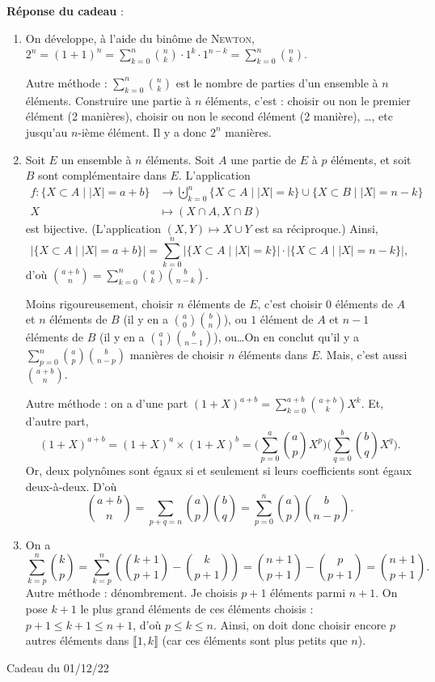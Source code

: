 \documentclass[a4paper]{article}
\begin{document}
	\textbf{Réponse du cadeau} :
	\begin{enumerate}
		\item On développe, à l'aide du binôme de \textsc{Newton}, $2^n = (1+1)^n = \sum_{k=0}^n {n \choose k}\cdot 1^k\cdot 1^{n-k} = \sum_{k=0}^n {n\choose k}$.

			Autre méthode : $\sum_{k=0}^n {n\choose k}$\/ est le nombre de parties d'un ensemble à $n$\/ éléments. Construire une partie à $n$\/ éléments, c'est : choisir ou non le premier élément (2 manières), choisir ou non le second élément (2 manière), \ldots, etc jusqu'au $n$-ième élément. Il y a donc $2^n$\/ manières.
		\item Soit $E$\/ un ensemble à $n$\/ éléments. Soit $A$\/ une partie de $E$ à $p$\/ éléments, et soit $B$\/ sont complémentaire dans $E$. L'application \begin{align*}
				f: \{X \subset A  \mid |X| = a + b\} &\longrightarrow \bigcupdot_{k=0}^n \{X \subset A  \mid |X| = k\} \cup \{ X \subset B  \mid |X| = n - k\} \\
				X &\longmapsto (X \cap A, X \cap B)
			\end{align*}
			est bijective. (L'application $(X,Y) \mapsto X \cup Y$\/ est sa réciproque.)
			Ainsi, \[|\{X \subset A  \mid |X| = a + b\}| = \sum_{k=0}^n |\{X \subset A  \mid |X| = k\}| \cdot |\{X \subset A  \mid |X| = n - k\}|,\] d'où ${a+b\choose n} = \sum_{k=0}^n {a\choose k}{b \choose n - k}$.

			Moins rigoureusement, choisir $n$\/ éléments de $E$, c'est choisir $0$\/ éléments de $A$\/ et $n$\/ éléments de $B$ (il y en a ${a\choose 0}{b\choose n}$), ou $1$\/ élément de $A$\/ et $n-1$\/ éléments de $B$\/ (il y en a ${a\choose 1}{b\choose n-1}$), ou\ldots\@ On en conclut qu'il y a $\sum_{p=0}^n {a\choose p}{b\choose n-p}$\/ manières de choisir $n$\/ éléments dans $E$. Mais, c'est aussi ${a+b\choose n}$.

			Autre méthode : on a d'une part $(1+X)^{a+b} = \sum_{k=0}^{a+b} {a+b\choose k} X^k$. Et, d'autre part,
			\[
				(1+X)^{a+b} = (1+X)^a \times (1+X)^b = \Big(\sum_{p=0}^a {a\choose p} X^p \Big)\Big(\sum_{q = 0}^b {b\choose q} X^q \Big)
			.\] Or, deux polynômes sont égaux si et seulement si leurs coefficients sont égaux deux-à-deux. D'où \[
				{a+b\choose n} = \sum_{p+q=n} {a\choose p}{b\choose q} = \sum_{p=0}^n {a\choose p}{b\choose n- p}
			.\]
		\item On a \[
				\sum_{k=p}^n {k\choose p} = \sum_{k=p}^n \left({k+1\choose p+1} - {k\choose p+1}\right) = {n+1\choose p+1} - {p\choose p+1} = {n+1\choose p+1}
			.\]
			Autre méthode : dénombrement. Je choisis $p+1$\/ éléments parmi $n+1$. On pose $k+1$\/ le plus grand éléments de ces éléments choisis : $p + 1 \le k+1 \le n+1$, d'où $p \le k \le n$.
			Ainsi, on doit donc choisir encore $p$\/ autres éléments dans $\llbracket 1, k\rrbracket$\/ (car ces éléments sont plus petits que $n$).
	\end{enumerate}
	\clearpage
	\centerline{\LARGE Cadeau du 01/12/22}
\end{document}
